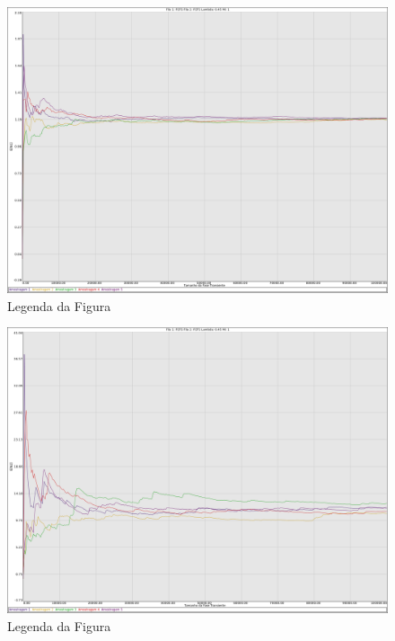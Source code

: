 \documentclass[a4paper,10pt]{article}
\begin{document}
\begin{figure}
	\caption{Legenda da Figura}
	\label{figTransienteFCFSfila1N}
	\includegraphics[scale = 0.2]{./graficos_transiente_1/FCFS/01.png}
\end{figure}

\begin{figure}
	\caption{Legenda da Figura}
	\label{figTransienteFCFSfila2N}
	\includegraphics[scale = 0.2]{./graficos_transiente_1/FCFS/02.png}
\end{figure}
\end{document}
